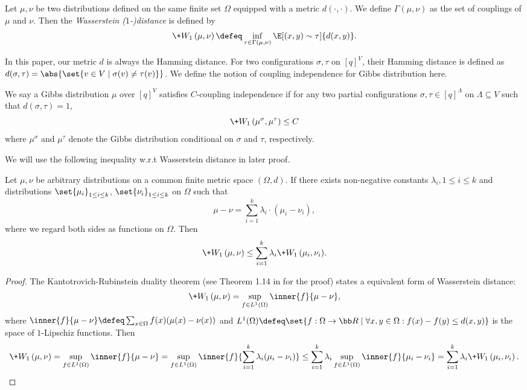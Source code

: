 \documentclass[a4paper,11pt]{article}
\newcommand{\W}[1]{\+W_1\left(#1\right)}
\begin{document}
\begin{definition}
    Let $\mu, \nu$ be two distributions defined on the same finite set $\Omega$ equipped with a metric $d(\cdot, \cdot)$. We define $\Gamma(\mu, \nu)$ as the set of couplings of $\mu$ and $\nu$. Then the \emph{Wasserstein ($1$-)distance} is defined by
    \[
    \W{\mu, \nu} \defeq
    \inf_{\tau\in \Gamma(\mu, \nu)} \E[(x, y)\sim \tau]{d(x, y)}.
    \]
\end{definition}


In this paper, our metric $d$ is always the Hamming distance. For two configurations $\sigma, \tau$ on $[q]^V$, their Hamming distance is defined as $d(\sigma, \tau)=\abs{\set{v \in V \mid \sigma(v)\neq \tau(v)}}$. We define the notion of coupling independence for Gibbs distribution here.
\begin{definition}
    We say a Gibbs distribution $\mu$ over $[q]^V$ satisfies $C$-coupling independence if for any two partial configurations $\sigma, \tau \in [q]^\Lambda$ on $\Lambda \subseteq V$ such that $d(\sigma, \tau)=1$,
    $$
\W{\mu^\sigma, \mu^\tau} \leq C
$$
where $\mu^\sigma$ and $\mu^\tau$ denote the Gibbs distribution conditional on $\sigma$ and $\tau$, respectively.
\end{definition}

We will use the following inequality w.r.t Wasserstein distance in later proof.
\begin{proposition}\label{prop:coupling-convex-decomposition}
    Let $\mu, \nu$ be arbitrary distributions on a common finite metric space $(\Omega, d)$.
    If there exists non-negative constants $\lambda_i, 1\le i\le k$
    and distributions $\set{\mu_i}_{1\le i\le k}$, $\set{\nu_i}_{1\le i\le k}$ on $\Omega$ such that
    \[
    \mu - \nu = \sum_{i=1}^k\lambda_i\cdot(\mu_i - \nu_i),
    \]
    where we regard both sides as functions on $\Omega$.
    Then
    \[
    \W{\mu, \nu} \le \sum_{i=1}^k \lambda_i{\W{\mu_i, \nu_i}}.
    \]
\end{proposition}
\begin{proof}
   The Kantotrovich-Rubinstein duality theorem (see Theorem 1.14 in \cite{villani2021topics}
   for the proof) states a equivalent form of Wasserstein distance:
   \begin{align*}
    \W{\mu, \nu} = \sup_{f\in L^1(\Omega)}\inner{f}{\mu - \nu},
   \end{align*}
   where $\inner{f}{\mu-\nu}\defeq\sum_{x\in \Omega} f(x)(\mu(x)-\nu(x))$ and
   $L^1(\Omega)\defeq\set{f:\Omega\to \bb R\mid \forall x, y\in \Omega : f(x)-f(y)\le d(x, y)}$
   is the space of $1$-Lipschiz functions.
   Then
   \begin{align*}
    \W{\mu, \nu} 
    =\sup_{f\in L^1(\Omega)}\inner{f}{\mu - \nu}
    =\sup_{f\in L^1(\Omega)}\inner{f}{\sum_{i=1}^k\lambda_i(\mu_i - \nu_i)}
    \le \sum_{i=1}^k\lambda_i\sup_{f\in L^1(\Omega)}\inner{f}{\mu_i - \nu_i}
    =\sum_{i=1}^k\lambda_i\W{\mu_i, \nu_i}.
   \end{align*}
\end{proof}
\end{document}
